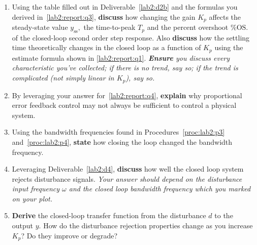 \begin{deliverable}[label={lab2:report}]
\begin{enumerate}[label={(\arabic*)}]
    \item{
      Using the table filled out in Deliverable~\ref{lab2:d2b} and the
      formulas you derived in~\ref{lab2:report:q3},
      \textbf{discuss} how changing the
      gain \(K_p\) affects the steady-state value \(y_\mathrm{ss},\) the
      time-to-peak \(T_p\) and the percent overshoot \(\%\mathrm{OS}.\)
      of the closed-loop second order step response.
      Also \textbf{discuss} how the settling time theoretically changes in the
      closed loop as a function of \(K_p\) using the estimate formula shown in
      \ref{lab2:report:q1}.
      \emph{\textbf{Ensure} you discuss every characteristic
      you've collected; if there is no trend, say so; if the trend is
      complicated (not simply linear in \(K_p\)), say so.}
      \label{lab2:report:q4}
    }
    \item{
      By leveraging your answer for~\ref{lab2:report:q4}, \textbf{explain} why
      proportional error feedback control may not always be sufficient to
      control a physical system.
      \label{lab2:report:q4b}
    }
    \item{
      Using the bandwidth frequencies found in Procedures~\ref{proc:lab2:p3}
      and~\ref{proc:lab2:p4}, \textbf{state} how closing the loop
      changed the bandwidth frequency.
      \label{lab2:report:q5}
    }
    \item{
      Leveraging Deliverable~\ref{lab2:d4}, \textbf{discuss} how well the
      closed loop system rejects disturbance signals.
      \emph{Your answer should depend on the disturbance input frequency
      \(\omega\) and the closed loop bandwidth frequency which you marked
      on your plot.}
      \label{lab2:report:q6}
    }
    \item{
      \textbf{Derive} the closed-loop transfer function from the
      disturbance \(d\) to the output \(y.\) How do the disturbance rejection
      properties change as you increase \(K_p\)? Do they improve or degrade?
}
\end{enumerate}
\end{deliverable}
